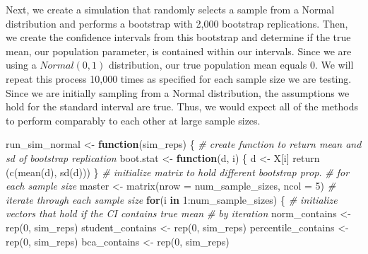 \documentclass[12pt]{article}
\newenvironment{Shaded}{\begin{snugshade}}{\end{snugshade}}
\newcommand{\AttributeTok}[1]{\textcolor[rgb]{0.77,0.63,0.00}{#1}}
\newcommand{\CommentTok}[1]{\textcolor[rgb]{0.56,0.35,0.01}{\textit{#1}}}
\newcommand{\ControlFlowTok}[1]{\textcolor[rgb]{0.13,0.29,0.53}{\textbf{#1}}}
\newcommand{\DecValTok}[1]{\textcolor[rgb]{0.00,0.00,0.81}{#1}}
\newcommand{\FunctionTok}[1]{\textcolor[rgb]{0.00,0.00,0.00}{#1}}
\newcommand{\NormalTok}[1]{#1}
\newcommand{\OtherTok}[1]{\textcolor[rgb]{0.56,0.35,0.01}{#1}}
\newcommand{\SpecialCharTok}[1]{\textcolor[rgb]{0.00,0.00,0.00}{#1}}
\begin{document}
Next, we create a simulation that randomly selects a sample from a
Normal distribution and performs a bootstrap with 2,000 bootstrap
replications. Then, we create the confidence intervals from this
bootstrap and determine if the true mean, our population parameter, is
contained within our intervals. Since we are using a \(Normal(0,1)\)
distribution, our true population mean equals 0. We will repeat this
process 10,000 times as specified for each sample size we are testing.
Since we are initially sampling from a Normal distribution, the
assumptions we hold for the standard interval are true. Thus, we would
expect all of the methods to perform comparably to each other at large
sample sizes.

\begin{Shaded}
\begin{Highlighting}[]
\NormalTok{run\_sim\_normal }\OtherTok{\textless{}{-}} \ControlFlowTok{function}\NormalTok{(sim\_reps) \{}
  \CommentTok{\# create function to return mean and sd of bootstrap replication}
\NormalTok{  boot.stat }\OtherTok{\textless{}{-}} \ControlFlowTok{function}\NormalTok{(d, i) \{}
\NormalTok{    d }\OtherTok{\textless{}{-}}\NormalTok{ X[i]}
    \FunctionTok{return}\NormalTok{ (}\FunctionTok{c}\NormalTok{(}\FunctionTok{mean}\NormalTok{(d), }\FunctionTok{sd}\NormalTok{(d)))}
\NormalTok{  \}}
  \CommentTok{\# initialize matrix to hold different bootstrap prop. }
  \CommentTok{\# for each sample size}
\NormalTok{  master }\OtherTok{\textless{}{-}} \FunctionTok{matrix}\NormalTok{(}\AttributeTok{nrow =}\NormalTok{ num\_sample\_sizes, }\AttributeTok{ncol =} \DecValTok{5}\NormalTok{)}
  \CommentTok{\# iterate through each sample size}
  \ControlFlowTok{for}\NormalTok{(i }\ControlFlowTok{in} \DecValTok{1}\SpecialCharTok{:}\NormalTok{num\_sample\_sizes) \{}
    \CommentTok{\# initialize vectors that hold if the CI contains true mean }
    \CommentTok{\# by iteration}
\NormalTok{    norm\_contains }\OtherTok{\textless{}{-}} \FunctionTok{rep}\NormalTok{(}\DecValTok{0}\NormalTok{, sim\_reps)}
\NormalTok{    student\_contains }\OtherTok{\textless{}{-}} \FunctionTok{rep}\NormalTok{(}\DecValTok{0}\NormalTok{, sim\_reps)}
\NormalTok{    percentile\_contains }\OtherTok{\textless{}{-}} \FunctionTok{rep}\NormalTok{(}\DecValTok{0}\NormalTok{, sim\_reps)}
\NormalTok{    bca\_contains }\OtherTok{\textless{}{-}} \FunctionTok{rep}\NormalTok{(}\DecValTok{0}\NormalTok{, sim\_reps)}
    

\end{Highlighting}
\end{Shaded}
\end{document}
